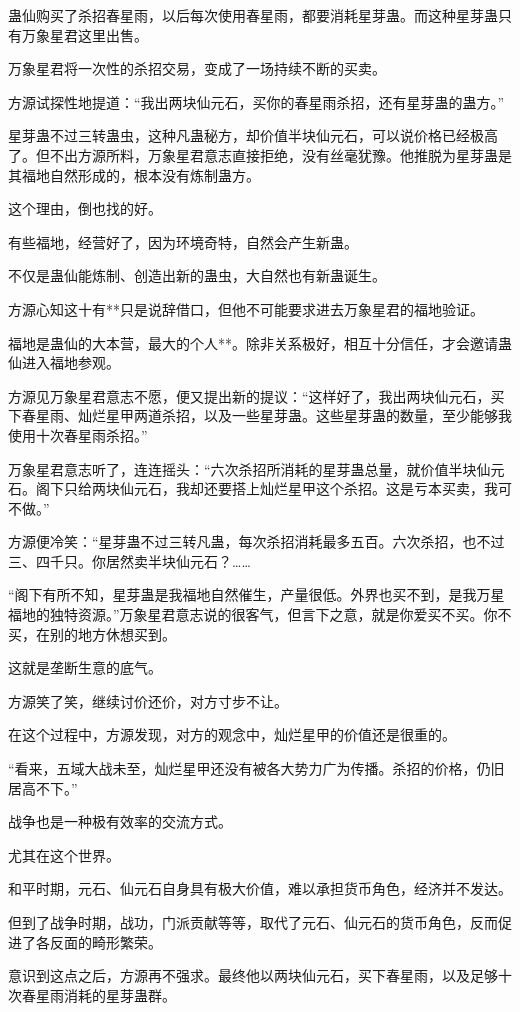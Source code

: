 \begin{this_body}
蛊仙购买了杀招春星雨，以后每次使用春星雨，都要消耗星芽蛊。而这种星芽蛊只有万象星君这里出售。

万象星君将一次性的杀招交易，变成了一场持续不断的买卖。

方源试探性地提道：“我出两块仙元石，买你的春星雨杀招，还有星芽蛊的蛊方。”

星芽蛊不过三转蛊虫，这种凡蛊秘方，却价值半块仙元石，可以说价格已经极高了。但不出方源所料，万象星君意志直接拒绝，没有丝毫犹豫。他推脱为星芽蛊是其福地自然形成的，根本没有炼制蛊方。

这个理由，倒也找的好。

有些福地，经营好了，因为环境奇特，自然会产生新蛊。

不仅是蛊仙能炼制、创造出新的蛊虫，大自然也有新蛊诞生。

方源心知这十有**只是说辞借口，但他不可能要求进去万象星君的福地验证。

福地是蛊仙的大本营，最大的个人**。除非关系极好，相互十分信任，才会邀请蛊仙进入福地参观。

方源见万象星君意志不愿，便又提出新的提议：“这样好了，我出两块仙元石，买下春星雨、灿烂星甲两道杀招，以及一些星芽蛊。这些星芽蛊的数量，至少能够我使用十次春星雨杀招。”

万象星君意志听了，连连摇头：“六次杀招所消耗的星芽蛊总量，就价值半块仙元石。阁下只给两块仙元石，我却还要搭上灿烂星甲这个杀招。这是亏本买卖，我可不做。”

方源便冷笑：“星芽蛊不过三转凡蛊，每次杀招消耗最多五百。六次杀招，也不过三、四千只。你居然卖半块仙元石？……

“阁下有所不知，星芽蛊是我福地自然催生，产量很低。外界也买不到，是我万星福地的独特资源。”万象星君意志说的很客气，但言下之意，就是你爱买不买。你不买，在别的地方休想买到。

这就是垄断生意的底气。

方源笑了笑，继续讨价还价，对方寸步不让。

在这个过程中，方源发现，对方的观念中，灿烂星甲的价值还是很重的。

“看来，五域大战未至，灿烂星甲还没有被各大势力广为传播。杀招的价格，仍旧居高不下。”

战争也是一种极有效率的交流方式。

尤其在这个世界。

和平时期，元石、仙元石自身具有极大价值，难以承担货币角色，经济并不发达。

但到了战争时期，战功，门派贡献等等，取代了元石、仙元石的货币角色，反而促进了各反面的畸形繁荣。

意识到这点之后，方源再不强求。最终他以两块仙元石，买下春星雨，以及足够十次春星雨消耗的星芽蛊群。


\end{this_body}
